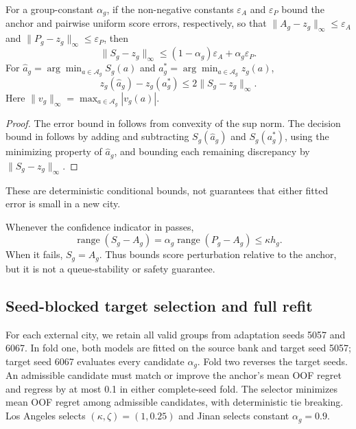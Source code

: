 \begin{proposition}
\label{prop:blend-bounds}
For a group-constant $\alpha_g$, if the non-negative constants
$\varepsilon_A$ and $\varepsilon_P$ bound the anchor and pairwise uniform
score errors, respectively, so that
$\|A_g-z_g\|_\infty\leq\varepsilon_A$ and
$\|P_g-z_g\|_\infty\leq\varepsilon_P$, then
\begin{equation}
 \|S_g-z_g\|_\infty
 \leq(1-\alpha_g)\varepsilon_A+\alpha_g\varepsilon_P.
 \label{eq:blend-error-bound}
\end{equation}
For $\widehat a_g=\arg\min_{a\in\mathcal A_g} S_g(a)$ and
$a_g^*=\arg\min_{a\in\mathcal A_g} z_g(a)$,
\begin{equation}
 z_g(\widehat a_g)-z_g(a_g^*)
 \leq2\|S_g-z_g\|_\infty.
 \label{eq:decision-bound}
\end{equation}
Here $\|v_g\|_\infty=\max_{a\in\mathcal A_g}|v_g(a)|$.
\end{proposition}
\begin{proof}
The error bound in  follows from convexity of the
sup norm.  The decision bound in  follows
by adding and subtracting $S_g(\widehat a_g)$ and $S_g(a_g^*)$, using the
minimizing property of $\widehat a_g$, and bounding each remaining discrepancy
by $\|S_g-z_g\|_\infty$.
\end{proof}
These are deterministic conditional bounds, not guarantees that either fitted
error is small in a new city.

\begin{corollary}
\label{cor:bounded-local-perturbation}
Whenever the confidence indicator in  passes,
\begin{equation}
 \operatorname{range}(S_g-A_g)
 =\alpha_g\operatorname{range}(P_g-A_g)\leq \kappa h_g.
 \label{eq:cap-bound}
\end{equation}
When it fails, $S_g=A_g$.  Thus  bounds score
perturbation relative to the anchor, but it is not a queue-stability or safety
guarantee.
\end{corollary}

\subsection{Seed-blocked target selection and full refit}

For each external city, we retain all valid groups from adaptation seeds
5057 and 6067.  In fold one, both models are fitted on the source bank and
target seed 5057; target seed 6067 evaluates every candidate $\alpha_g$.
Fold two reverses the target seeds.  An admissible candidate must match or
improve the anchor's mean OOF regret and regress by at most 0.1 in either
complete-seed fold.  The selector minimizes mean OOF regret among admissible
candidates, with deterministic tie breaking.  Los Angeles selects
$(\kappa,\zeta)=(1,0.25)$ and Jinan selects constant $\alpha_g=0.9$.

